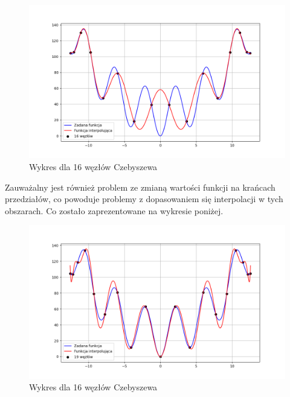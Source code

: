\documentclass{article}
\begin{document}
\begin{figure}[H]
\centering
  \begin{minipage}[b]{0.49\textwidth}
    \includegraphics[width=\textwidth]{img06_n=16.png}
    \caption{Wykres dla 16 węzłów Czebyszewa}
  \end{minipage}
\end{figure}

\newpage

Zauważalny jest również problem ze zmianą wartości funkcji na krańcach przedziałów, co powoduje problemy z dopasowaniem się interpolacji w tych obszarach. Co zostało zaprezentowane na wykresie poniżej.

\begin{figure}[H]
\centering
  \begin{minipage}[b]{0.49\textwidth}
    \includegraphics[width=\textwidth]{img06_n=19.png}
    \caption{Wykres dla 16 węzłów Czebyszewa}
  \end{minipage}
\end{figure}
\end{document}

